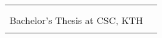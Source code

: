\documentclass{a0poster}
\begin{document}
\begin{tabular}{ll}

  \begin{minipage}{425mm}

    {\Huge\bf Probabilistic Tracking of Multiple Rodent Whiskers In Monocular Video Sequences}\\[10mm]
    {\Large\bf Jim Holmström, \; Emil Lundberg\\[3mm]
      Bachelor's Thesis at CSC, KTH} \\


    \vspace*{5mm}

    

  \end{minipage}

\end{tabular}

\vspace*{25mm}

\begin{minipage}{\linewidth}

  \begin{multicols*}{2}
    
    
    
    
    
    

    
    
    

    
    

  \end{multicols*}

\end{minipage}
\end{document}
